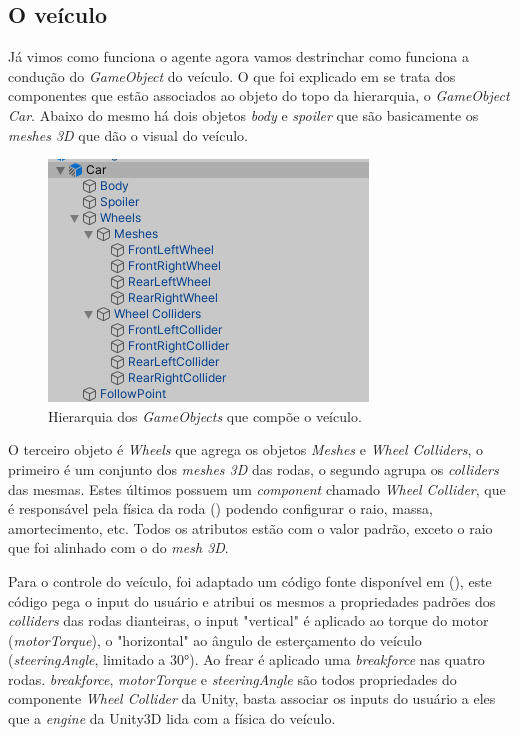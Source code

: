 \subsection{O veículo}
Já vimos como funciona o agente agora vamos destrinchar como funciona a condução do \textit{GameObject} do veículo. O que foi explicado em  se trata dos componentes que estão associados ao objeto do topo da hierarquia, o \textit{GameObject Car}. Abaixo do mesmo há dois objetos \textit{body} e \textit{spoiler} que são basicamente os \textit{meshes 3D} que dão o visual do veículo.

\begin{figure}[h]
   \centering
   \includegraphics{figs/hierarquia-veiculo.png}
    \caption{Hierarquia dos \textit{GameObjects} que compõe o veículo.}
    \label{fig:vehicle-hierarchy}
\end{figure}

O terceiro objeto é \textit{Wheels} que agrega os objetos \textit{Meshes} e \textit{Wheel Colliders}, o primeiro é um conjunto dos \textit{meshes 3D} das rodas, o segundo agrupa os \textit{colliders} das mesmas. Estes últimos possuem um \textit{component} chamado \textit{Wheel Collider}, que é responsável pela física da roda () podendo configurar o raio, massa, amortecimento, etc. Todos os atributos estão com o valor padrão, exceto o raio que foi alinhado com o do \textit{mesh 3D}.

Para o controle do veículo, foi adaptado um código fonte disponível em (), este código pega o input do usuário e atribui os mesmos a propriedades padrões dos \textit{colliders} das rodas dianteiras, o input "vertical" é aplicado ao torque do motor (\textit{motorTorque}), o "horizontal" ao ângulo de esterçamento do veículo (\textit{steeringAngle}, limitado a 30°). Ao frear é aplicado uma \textit{breakforce} nas quatro rodas. \textit{breakforce}, \textit{motorTorque} e \textit{steeringAngle} são todos propriedades do componente \textit{Wheel Collider} da Unity, basta associar os inputs do usuário a eles que a \textit{engine} da Unity3D lida com a física do veículo.

